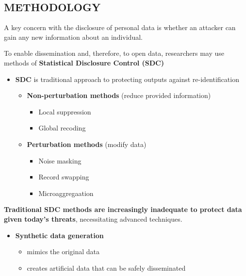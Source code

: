 \documentclass[a0,portrait]{a0poster}
\begin{document}
\begin{multicols}{3}
\section{METHODOLOGY}

A key concern with the disclosure of personal data is whether an attacker can gain any new information about an individual. 

\vspace{0.5cm}
To enable dissemination and, therefore, to open data, researchers may use methods of \textbf{Statistical Disclosure Control (SDC)} \cite{2012_Hundepool}

\vspace{1cm}
\begin{itemize}
    \item[\ding{228}]  \textbf{SDC} is traditional approach to protecting outputs against re-identification
        \begin{itemize}
            \item \textbf{Non-perturbation methods} (reduce provided information)
                \begin{itemize}
                    \item Local suppression %
                    \item Global recoding %
                \end{itemize}   
\columnbreak %
\vspace{1cm}
            \item \textbf{Perturbation methods} (modify data)
                \begin{itemize}
                    \item Noise masking
                    \item Record swapping
                    \item Microaggregaation
                \end{itemize}             
        \end{itemize}   
\end{itemize}

\textbf{Traditional SDC methods are increasingly inadequate to protect data given today's threats}, necessitating advanced techniques. 

\begin{itemize}
     \item[\ding{228}] \textbf{Synthetic data generation}
        \begin{itemize}
            \item mimics the original data
            \item creates artificial data that can be safely disseminated
        \end{itemize}        
\end{itemize}


\end{multicols}
\end{document}
